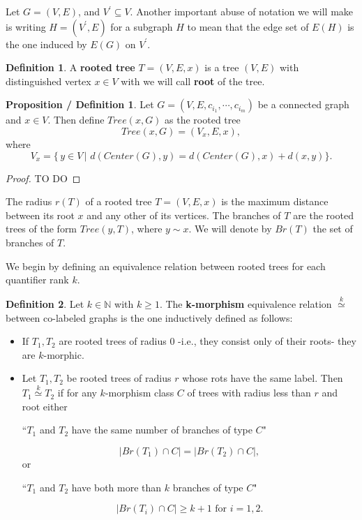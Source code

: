 \documentclass[11pt,notitlepage]{report}
\theoremstyle{definition}
\newtheorem{definition}{Definition}[chapter]
\newtheorem{propdef}{Proposition / Definition}[chapter]
\newcommand{\N}{\mathbb{N}}
\newcommand{\clist}{c_{i_1}, \cdots, c_{i_m}}
\newcommand{\morph}[1]{\stackrel{#1}{\simeq}}
\begin{document}
Let $G=(V,E)$, and $V^\prime\subseteq V$. Another important abuse 
of notation we will make is writing $H=(V^\prime, E)$ 
for a subgraph $H$ to mean that the edge set of $E(H)$ is the one
induced by $E(G)$ on $V^\prime$.

\begin{definition} 
	A \textbf{rooted tree} $T=(V,E,x)$ is a tree 
	$(V,E)$ with distinguished vertex $x\in V$ with we will call 
	\textbf{root} of the tree.
\end{definition}

\begin{propdef}
	Let $G=(V,E,\clist)$ be a connected graph and $x\in V$. 
	Then define $Tree(x,G)$	as the rooted tree
	\[Tree(x,G) = (V_x,E,x),\] where
	\[V_x= \{\, y\in V \, | \,\,d(Center(G),y) = d(Center(G),x) + d(x,y) \}.\]

\end{propdef}
\begin{proof}
	TO DO
\end{proof}



The radius $r(T)$ of a rooted tree $T=(V,E,x)$
is the maximum distance between its root $x$ and any other of
its vertices. The branches of $T$ are the rooted trees of the form
$Tree(y,T)$, where $y\sim x$. We will denote by $Br(T)$ the set of
branches of $T$. \par

We begin by defining an equivalence relation between rooted 
trees for each quantifier rank $k$.

\begin{definition} 
	Let $k\in \N$ with $k\geq 1$. The \textbf{k-morphism} equivalence relation
	$\morph{k}$ between
	co-labeled graphs is the one inductively defined as follows:
	\begin{itemize}
		\item If $T_1, T_2$ are rooted trees of radius $0$ -i.e., they
		consist only of their roots- they are $k$-morphic. 
		\item Let $T_1, T_2$ be rooted trees of radius $r$ whose 
		rots have the same label. Then $T_1 \morph{k} T_2$ if 
		for any $k$-morphism class $C$ of trees with
		radius less than $r$ and root either
		\begin{center}
			\vspace{-0.2cm}
			``$T_1$ and $T_2$ have the same number of branches of type $C$"
		\end{center}
		\vspace{-0.3cm}
		\[ |Br(T_1)\cap C| = |Br(T_2)\cap C|,\]
		or 
		\begin{center}
			\vspace{-0.2cm}
			``$T_1$ and $T_2$ have both more than $k$ branches of type $C$"
		\end{center}
	\vspace{-0.3cm}
		\[ |Br(T_i)\cap C| \geq k+1 \text{ for } i=1,2. \]
	\end{itemize} 
\end{definition}
\end{document}
